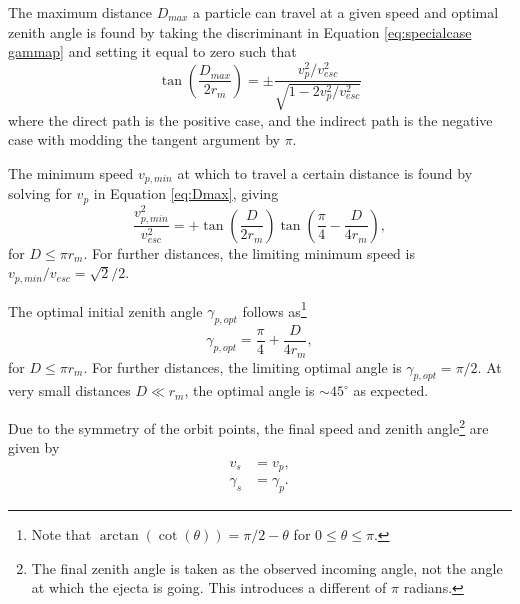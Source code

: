 \documentclass{article}
\begin{document}
The maximum distance $D_{max}$ a particle can travel at a given speed and optimal zenith angle is found by taking the discriminant in Equation \eqref{eq:specialcase gammap} and setting it equal to zero such that
\begin{equation}\label{eq:Dmax}
\tan\left(\frac{D_{max}}{2r_m}\right) = \pm\frac{v_p^2/v_{esc}^2}{\sqrt{1-2v_p^2/v_{esc}^2}}
\end{equation}
where the direct path is the positive case, and the indirect path is the negative case with modding the tangent argument by $\pi$.

The minimum speed $v_{p,min}$ at which to travel a certain distance is found by solving for $v_p$ in Equation \eqref{eq:Dmax}, giving
\begin{equation}\label{eq:vpmin_special}
\frac{v_{p,min}^2}{v_{esc}^2} = +\tan\left(\frac{D}{2r_m}\right)\tan\left(\frac{\pi}{4}- \frac{D}{4r_m}\right),
\end{equation}
for $D \le \pi r_m$. For further distances, the limiting minimum speed is $v_{p,min}/v_{esc} = \sqrt{2}/2$.

The optimal initial zenith angle $\gamma_{p,opt}$ follows as\footnote{Note that $\arctan(\cot(\theta)) = \pi/2 - \theta$ for $0 \le \theta \le \pi$.}
\begin{equation}
\gamma_{p,opt} = \frac{\pi}{4} + \frac{D}{4r_m},
\end{equation}
for $D \le \pi r_m$. For further distances, the limiting optimal angle is $\gamma_{p,opt} = \pi/2$. At very small distances $D \ll r_m$, the optimal angle is $\sim 45^\circ$ as expected.

Due to the symmetry of the orbit points, the final speed and zenith angle\footnote{The final zenith angle is taken as the observed incoming angle, not the angle at which the ejecta is going. This introduces a different of $\pi$ radians.} are given by
\begin{align}
v_s &= v_p,\\
\gamma_s &= \gamma_p.
\end{align}
\end{document}
